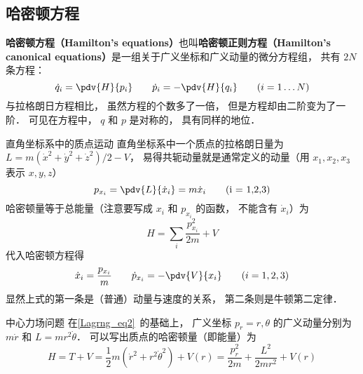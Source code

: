 \subsection{哈密顿方程}
\textbf{哈密顿方程（Hamilton's equations）}也叫\textbf{哈密顿正则方程（Hamilton's canonical equations）}是一组关于广义坐标和广义动量的微分方程组， 共有 $2N$ 条方程：
\begin{equation}\label{HamCan_eq2}
\dot q_i = \pdv{H}{p_i}
\qquad
\dot p_i = -\pdv{H}{q_i}
\qquad
(i = 1\dots N)
\end{equation}
与拉格朗日方程相比， 虽然方程的个数多了一倍， 但是方程却由二阶变为了一阶． 可见在方程中， $q$ 和 $p$ 是对称的， 具有同样的地位．

\begin{example}{直角坐标系中的质点运动}
直角坐标系中一个质点的拉格朗日量为 $L = m(\dot x^2 + \dot y^2 + \dot z^2)/2 - V$， 易得共轭动量就是通常定义的动量（用 $x_1,x_2,x_3$ 表示 $x, y, z$）
\begin{equation}
p_{x_i} = \pdv{L}{\dot x_i} = m\dot x_i \qquad \text{(i = 1,2,3)}
\end{equation}
哈密顿量等于总能量（注意要写成 $x_i$ 和 $p_{x_i}$ 的函数， 不能含有 $\dot x_i$）为
\begin{equation}
H = \sum_i \frac{p_{x_i}^2}{2m} + V
\end{equation}
代入哈密顿方程得
\begin{equation}
\dot x_i = \frac{p_{x_i}}{m}
\qquad
\dot p_{x_i} = -\pdv{V}{x_i}
\qquad (i = 1,2,3)
\end{equation}
显然上式的第一条是（普通）动量与速度的关系， 第二条则是牛顿第二定律．
\end{example}

\begin{example}{中心力场问题}
在\autoref{Lagrng_eq2}~的基础上， 广义坐标 $p_r = r, \theta$ 的广义动量分别为 $m\dot r$ 和 $L = mr^2\dot \theta$． 可以写出质点的哈密顿量（即能量）为
\begin{equation}
H = T + V = \frac12 m(\dot r^2 + r^2 \dot \theta^2) + V(r) = \frac{p_r^2}{2m} + \frac{L^2}{2mr^2} + V(r)
\end{equation}
\end{example}


